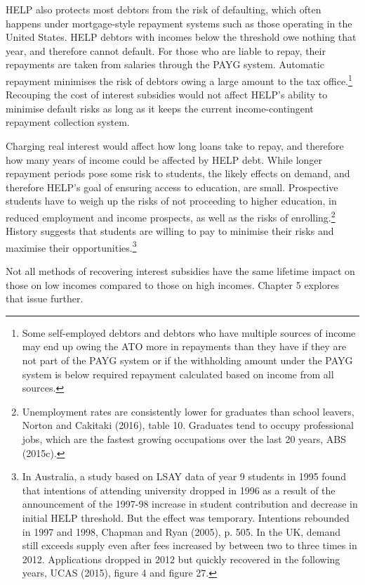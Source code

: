 \documentclass[]{book}
\begin{document}
HELP also protects most debtors from the risk of defaulting, which often happens under mortgage-style repayment systems such as those operating in the United States. HELP debtors with incomes below the threshold owe nothing that year, and therefore cannot default. For those who are liable to repay, their repayments are taken from salaries through the PAYG system. Automatic repayment minimises the risk of debtors owing a large amount to the tax office.\footnote{Some self-employed debtors and debtors who have multiple sources of income may end up owing the ATO more in repayments than they have if they are not part of the PAYG system or if the withholding amount under the PAYG system is below required repayment calculated based on income from all sources.} Recouping the cost of interest subsidies would not affect HELP's ability to minimise default risks as long as it keeps the current income-contingent repayment collection system.

Charging real interest would affect how long loans take to repay, and therefore how many years of income could be affected by HELP debt. While longer repayment periods pose some risk to students, the likely effects on demand, and therefore HELP's goal of ensuring access to education, are small. Prospective students have to weigh up the risks of not proceeding to higher education, in reduced employment and income prospects, as well as the risks of enrolling.\footnote{Unemployment rates are consistently lower for graduates than school leavers, Norton and Cakitaki (2016), table 10. Graduates tend to occupy professional jobs, which are the fastest growing occupations over the last 20 years, ABS (2015c).} History suggests that students are willing to pay to minimise their risks and maximise their opportunities.\footnote{In Australia, a study based on LSAY data of year 9 students in 1995 found that intentions of attending university dropped in 1996 as a result of the announcement of the 1997-98 increase in student contribution and decrease in initial HELP threshold. But the effect was temporary. Intentions rebounded in 1997 and 1998, Chapman and Ryan (2005), p. 505. In the UK, demand still exceeds supply even after fees increased by between two to three times in 2012. Applications dropped in 2012 but quickly recovered in the following years, UCAS (2015), figure 4 and figure 27.}

Not all methods of recovering interest subsidies have the same lifetime impact on those on low incomes compared to those on high incomes. Chapter 5 explores that issue further.
\end{document}
